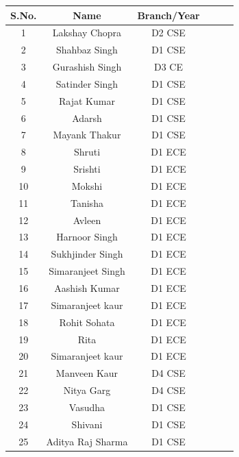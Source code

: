 \documentclass[12pt, a4 paper]{article}
\begin{document}
\begin{table}[h!]
  \begin{center}
    \begin{tabular}{|c|c|c|c|c|c|} 
    \toprule %
      \textbf{S.No.} & \textbf{Name} & \textbf{Branch/Year} \\
      \midrule %
      1 & Lakshay Chopra    & D2 CSE \\          
      2 & Shahbaz Singh     & D1 CSE \\         
      3 & Gurashish Singh   & D3 CE  \\   
      4 & Satinder Singh    & D1 CSE \\
      5 & Rajat Kumar       & D1 CSE \\
      6 & Adarsh            & D1 CSE \\
      7 & Mayank Thakur     & D1 CSE \\
      8 & Shruti            & D1 ECE \\
      9 & Srishti           & D1 ECE \\
     10 & Mokshi            & D1 ECE \\
     11 & Tanisha           & D1 ECE \\
     12 & Avleen            & D1 ECE \\
     13 & Harnoor Singh     & D1 ECE \\
     14 & Sukhjinder Singh  & D1 ECE \\
     15 & Simaranjeet Singh & D1 ECE \\
     16 & Aashish Kumar     & D1 ECE \\
     17 & Simaranjeet kaur  & D1 ECE \\
     18 & Rohit Sohata      & D1 ECE \\
     19 & Rita              & D1 ECE \\
     20 & Simaranjeet kaur  & D1 ECE \\
     21 & Manveen Kaur      & D4 CSE \\
     22 & Nitya Garg        & D4 CSE \\
     23 & Vasudha           & D1 CSE \\
     24 & Shivani           & D1 CSE \\
     25 & Aditya Raj Sharma & D1 CSE \\

      \bottomrule %
    \end{tabular}
  \end{center}
\end{table}
\end{document}
